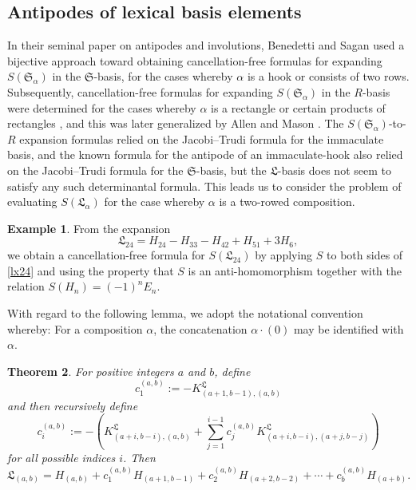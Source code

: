 \documentclass{amsart}
\newtheorem{theorem}{Theorem}[section]
\theoremstyle{definition}
\newtheorem{example}[theorem]{Example}
\newcommand{\lx}{\mathfrak{L}}
\begin{document}
\subsection{Antipodes of lexical basis elements}
 In their seminal paper on antipodes and involutions, Benedetti and Sagan \cite{BenedettiSagan2017} used a bijective approach toward 
 obtaining cancellation-free formulas for expanding $S(\mathfrak{S}_{\alpha})$ in the $\mathfrak{S}$-basis, for the cases whereby 
 $\alpha$ is a hook or consists of two rows. Subsequently, cancellation-free formulas for expanding $S(\mathfrak{S}_{\alpha})$ in the 
 $R$-basis were determined for the cases whereby $\alpha$ is a rectangle or certain products of rectangles \cite{Campbell2023}, and this 
 was later generalized by Allen and Mason \cite{AllenMason2025}. The $S(\mathfrak{S}_{\alpha})$-to-$R$ expansion formulas relied on 
 the Jacobi--Trudi formula for the immaculate basis, and the known formula for the antipode of an immaculate-hook also relied on the 
 Jacobi--Trudi formula for the $\mathfrak{S}$-basis, but the $\lx$-basis does not seem to satisfy any such determinantal formula. This 
 leads us to consider the problem of evaluating $S(\lx_{\alpha})$ for the case whereby $\alpha$ is a two-rowed composition. 

\begin{example}
 From the expansion 
\begin{equation}\label{lx24}
 \lx_{24} = H_{24} - H_{33} - H_{42} + H_{51} + 3 H_{6}, 
\end{equation}
 we obtain a cancellation-free formula for $S(\lx_{24})$ by applying $S$ to both sides of \eqref{lx24} and using the property that $S$ is an 
 anti-homomorphism together with the relation $S(H_{n}) = (-1)^n E_n$. 
\end{example}

 With regard to the following lemma, we adopt the notational convention whereby: For a composition $\alpha$, the concatenation 
 $\alpha \cdot (0)$ may be identified with $\alpha$. 

\begin{theorem}\label{mainccoeff}
 For positive integers $a$ and $b$, define $$c^{(a, b)}_{1} := -K^{\lx}_{(a+1,b-1), (a, b)}$$ and then recursively define $$ c^{(a, 
 b)}_{i} := -\left( K^{\lx}_{(a+i,b-i), (a, b)} + \sum_{j=1}^{i-1} c^{(a, b)}_{j} K^{\lx}_{(a+i,b-i),(a+j,b-j)} \right) $$ for all 
 possible indices $i$. Then 
\begin{equation}\label{lxtworowexp} 
 \lx_{(a, b)} = H_{(a, b)} 
 + c_{1}^{(a, b)} H_{(a+1, b-1)} 
 + c_{2}^{(a, b)} H_{(a+2,b-2)}
 + \cdots + c_{b}^{(a, b)} H_{(a+b)}. 
\end{equation}
\end{theorem}
\end{document}
